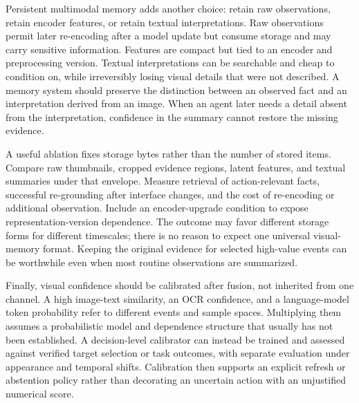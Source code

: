 Persistent multimodal memory adds another choice: retain raw observations, retain encoder features, or retain textual interpretations. Raw observations permit later re-encoding after a model update but consume storage and may carry sensitive information. Features are compact but tied to an encoder and preprocessing version. Textual interpretations can be searchable and cheap to condition on, while irreversibly losing visual details that were not described. A memory system should preserve the distinction between an observed fact and an interpretation derived from an image. When an agent later needs a detail absent from the interpretation, confidence in the summary cannot restore the missing evidence.

A useful ablation fixes storage bytes rather than the number of stored items. Compare raw thumbnails, cropped evidence regions, latent features, and textual summaries under that envelope. Measure retrieval of action-relevant facts, successful re-grounding after interface changes, and the cost of re-encoding or additional observation. Include an encoder-upgrade condition to expose representation-version dependence. The outcome may favor different storage forms for different timescales; there is no reason to expect one universal visual-memory format. Keeping the original evidence for selected high-value events can be worthwhile even when most routine observations are summarized.

Finally, visual confidence should be calibrated after fusion, not inherited from one channel. A high image-text similarity, an OCR confidence, and a language-model token probability refer to different events and sample spaces. Multiplying them assumes a probabilistic model and dependence structure that usually has not been established. A decision-level calibrator can instead be trained and assessed against verified target selection or task outcomes, with separate evaluation under appearance and temporal shifts. Calibration then supports an explicit refresh or abstention policy rather than decorating an uncertain action with an unjustified numerical score.

